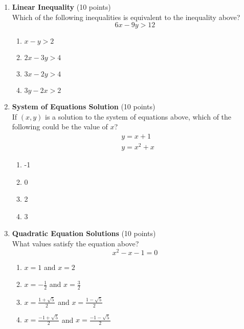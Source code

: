 \begin{enumerate}
  \item \textbf{Linear Inequality} (10 points)\\
  Which of the following inequalities is equivalent to the inequality above?
  \[
  6 x-9 y>12
  \]
  \begin{enumerate}[label=(\Alph*)]
    \item $x-y>2$
    \item $2 x-3 y>4$
    \item $3 x-2 y>4$
    \item $3 y-2 x>2$
  \end{enumerate}
  \begin{subanswer}
  \end{subanswer}

  \newpage

  \item \textbf{System of Equations Solution} (10 points)\\
  If $(x, y)$ is a solution to the system of equations above, which of the following could be the value of $x$?
  \[
  \begin{aligned}
  & y=x+1 \\
  & y=x^{2}+x
  \end{aligned}
  \]
  \begin{enumerate}[label=(\Alph*)]
    \item -1
    \item 0
    \item 2
    \item 3
  \end{enumerate}
  \begin{subanswer}
  \end{subanswer}

  \item \textbf{Quadratic Equation Solutions} (10 points)\\
  What values satisfy the equation above?
  \[
  x^{2}-x-1=0
  \]
  \begin{enumerate}[label=(\Alph*)]
    \item $x=1$ and $x=2$
    \item $x=-\frac{1}{2}$ and $x=\frac{3}{2}$
    \item $x=\frac{1+\sqrt{5}}{2}$ and $x=\frac{1-\sqrt{5}}{2}$
    \item $x=\frac{-1+\sqrt{5}}{2}$ and $x=\frac{-1-\sqrt{5}}{2}$
  \end{enumerate}
  \begin{subanswer}
  \end{subanswer}


\end{enumerate}
